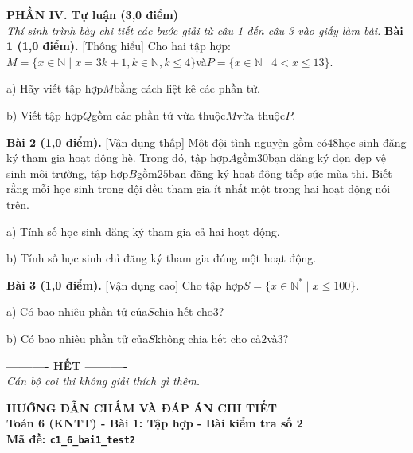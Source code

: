 \documentclass[11pt,a4paper]{article}
\begin{document}
\vspace{6pt}
\noindent
\textbf{\large PHẦN IV. Tự luận (3,0 điểm)}\\
\textit{\small Thí sinh trình bày chi tiết các bước giải từ câu 1 đến câu 3 vào giấy làm bài.}
\vspace{6pt}
\noindent\textbf{Bài 1 (1,0 điểm).} [Thông hiểu] Cho hai tập hợp:$M = \{x \in \mathbb{N} \mid x = 3k + 1, k \in \mathbb{N}, k \le 4\}$và$P = \{x \in \mathbb{N} \mid 4 < x \le 13\}$.\par\noindent a) Hãy viết tập hợp$M$bằng cách liệt kê các phần tử.\par\noindent b) Viết tập hợp$Q$gồm các phần tử vừa thuộc$M$vừa thuộc$P$.\par\vspace{8pt}

\noindent\textbf{Bài 2 (1,0 điểm).} [Vận dụng thấp] Một đội tình nguyện gồm có$48$học sinh đăng ký tham gia hoạt động hè. Trong đó, tập hợp$A$gồm$30$bạn đăng ký dọn dẹp vệ sinh môi trường, tập hợp$B$gồm$25$bạn đăng ký hoạt động tiếp sức mùa thi. Biết rằng mỗi học sinh trong đội đều tham gia ít nhất một trong hai hoạt động nói trên.\par\noindent a) Tính số học sinh đăng ký tham gia cả hai hoạt động.\par\noindent b) Tính số học sinh chỉ đăng ký tham gia đúng một hoạt động.\par\vspace{8pt}

\noindent\textbf{Bài 3 (1,0 điểm).} [Vận dụng cao] Cho tập hợp$S = \{x \in \mathbb{N}^* \mid x \le 100\}$.\par\noindent a) Có bao nhiêu phần tử của$S$chia hết cho$3$?\par\noindent b) Có bao nhiêu phần tử của$S$không chia hết cho cả$2$và$3$?\par\vspace{8pt}


\begin{center}
\textbf{---------- HẾT ----------}\\
\textit{\small Cán bộ coi thi không giải thích gì thêm.}
\end{center}

\newpage
\begin{center}
{\Large\bfseries HƯỚNG DẪN CHẤM VÀ ĐÁP ÁN CHI TIẾT}\\[4pt]
{\large\bfseries Toán 6 (KNTT) - Bài 1: Tập hợp - Bài kiểm tra số 2}\\[2pt]
{\bfseries Mã đề: \texttt{c1\_6\_bai1\_test2}}
\end{center}
\end{document}
